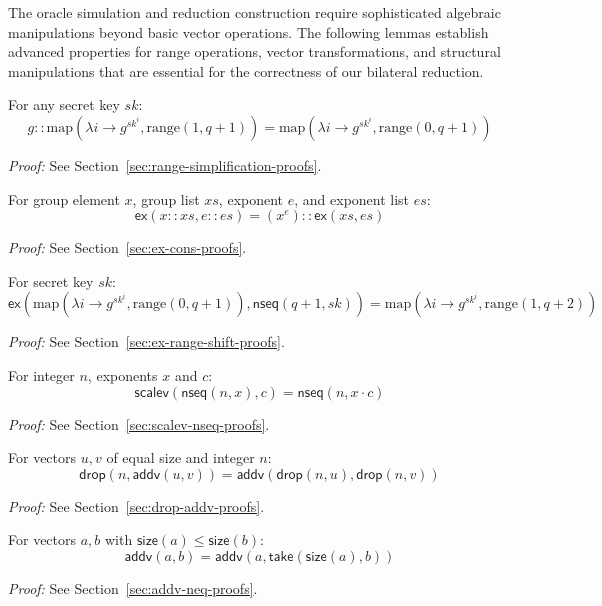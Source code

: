 The oracle simulation and reduction construction require sophisticated algebraic manipulations beyond basic vector operations. The following lemmas establish advanced properties for range operations, vector transformations, and structural manipulations that are essential for the correctness of our bilateral reduction.

\begin{lemma}
\label{lem:q0-simp}
For any secret key $sk$:
\[
g :: \text{map}(\lambda i \rightarrow g^{sk^i}, \text{range}(1, q+1)) = \text{map}(\lambda i \rightarrow g^{sk^i}, \text{range}(0, q+1))
\]
\end{lemma}
\noindent \textit{Proof:} See Section~\ref{sec:range-simplification-proofs}.

\begin{lemma}
\label{lem:ex-cons-general}
For group element $x$, group list $xs$, exponent $e$, and exponent list $es$:
\[
\mathsf{ex}(x :: xs, e :: es) = (x^e) :: \mathsf{ex}(xs, es)
\]
\end{lemma}
\noindent \textit{Proof:} See Section~\ref{sec:ex-cons-proofs}.

\begin{lemma}
\label{lem:ex-range-shift}
For secret key $sk$:
\[
\mathsf{ex}(\text{map}(\lambda i \rightarrow g^{sk^i}, \text{range}(0, q+1)), \mathsf{nseq}(q+1, sk)) = \text{map}(\lambda i \rightarrow g^{sk^i}, \text{range}(1, q+2))
\]
\end{lemma}
\noindent \textit{Proof:} See Section~\ref{sec:ex-range-shift-proofs}.

\begin{lemma}
\label{lem:scalev-nseq}
For integer $n$, exponents $x$ and $c$:
\[
\mathsf{scalev}(\mathsf{nseq}(n, x), c) = \mathsf{nseq}(n, x \cdot c)
\]
\end{lemma}
\noindent \textit{Proof:} See Section~\ref{sec:scalev-nseq-proofs}.

\begin{lemma}
\label{lem:drop-addv}
For vectors $u, v$ of equal size and integer $n$:
\[
\mathsf{drop}(n, \mathsf{addv}(u, v)) = \mathsf{addv}(\mathsf{drop}(n, u), \mathsf{drop}(n, v))
\]
\end{lemma}
\noindent \textit{Proof:} See Section~\ref{sec:drop-addv-proofs}.

\begin{lemma}
\label{lem:addv-neq}
For vectors $a, b$ with $\mathsf{size}(a) \leq \mathsf{size}(b)$:
\[
\mathsf{addv}(a, b) = \mathsf{addv}(a, \mathsf{take}(\mathsf{size}(a), b))
\]
\end{lemma}
\noindent \textit{Proof:} See Section~\ref{sec:addv-neq-proofs}.

